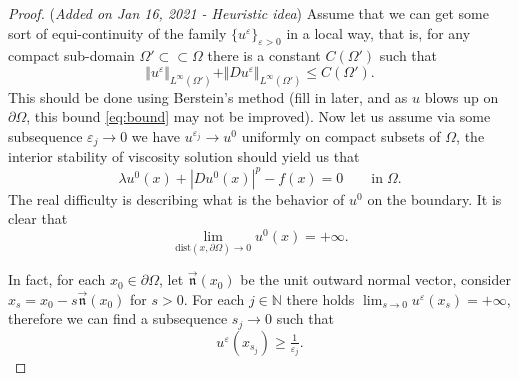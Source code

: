 \documentclass[11pt,reqno]{amsart}
\numberwithin{figure}{section}
\theoremstyle{plain}
\theoremstyle{remark}
\numberwithin{equation}{section}
\begin{document}
\color{blue}
\begin{proof} (\textit{Added on Jan 16, 2021 - Heuristic idea}) Assume that we can get some sort of equi-continuity of the family $\{u^\varepsilon\}_{\varepsilon>0}$ in a local way, that is, for any compact sub-domain $\Omega'\subset\subset \Omega$ there is a constant $C(\Omega')$ such that
\begin{equation}\label{eq:bound}
    \Vert u^\varepsilon\Vert_{L^\infty(\Omega')} +\Vert Du^\varepsilon\Vert_{L^\infty(\Omega')} \leq C(\Omega').
\end{equation}
This should be done using Berstein's method (fill in later, and as $u$ blows up on $\partial \Omega$, this bound \eqref{eq:bound} may not be improved). Now let us assume via some subsequence $\varepsilon_j\to 0$ we have $u^{\varepsilon_j}\rightarrow u^0$ uniformly on compact subsets of $\Omega$, the interior stability of viscosity solution should yield us that 
\begin{equation*}
    \lambda u^0(x) + |Du^0(x)|^p - f(x) = 0 \qquad\text{in}\;\Omega.
\end{equation*}
The real difficulty is describing what is the behavior of $u^0$ on the boundary. It is clear that
\begin{equation*}
    \displaystyle  \lim_{\mathrm{dist}(x,\partial \Omega)\to 0} u^0(x) = +\infty.
\end{equation*}

In fact, for each $x_0\in \partial \Omega$, let $\Vec{\mathfrak{n}}(x_0)$ be the unit outward normal vector, consider $x_s = x_0 - s\Vec{\mathfrak{n}}(x_0)$ for $s>0$. For each $j\in \mathbb{N}$ there holds $\lim_{s\to 0} u^\varepsilon(x_s) = +\infty$, therefore we can find a subsequence $s_j \to 0$ such that 
\begin{equation*}
    u^\varepsilon(x_{s_j}) \geq \tfrac{1}{\varepsilon_j}.
\end{equation*}
\vspace{2cm}





\end{proof}
\end{document}
